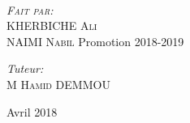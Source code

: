 \documentclass[12pt, a4paper, openany]{report}
\begin{document}
\begin{titlepage}
\begin{sffamily}
\begin{center}
    \\[1cm]
    \begin{minipage}{0.4\textwidth}
      \begin{flushleft} \large
         \textsc{\emph {Fait par:} \\KHERBICHE Ali\\ NAIMI Nabil}  
          \newline
          Promotion 2018-2019 \\
      \end{flushleft}
    \end{minipage}
    \begin{minipage}{0.4\textwidth}
      \begin{flushright} \large
        \emph{Tuteur:\\} \textsc{M Hamid DEMMOU}
      \end{flushright}
    \end{minipage}
    \vfill
    {\large Avril 2018}
  \end{center}
  \end{sffamily}                
  \end{titlepage}  
\makeatother
   
\renewcommand{\contentsname}{Sommaire}
\tableofcontents
\listoffigures







%
%
%

  
\end{document}
